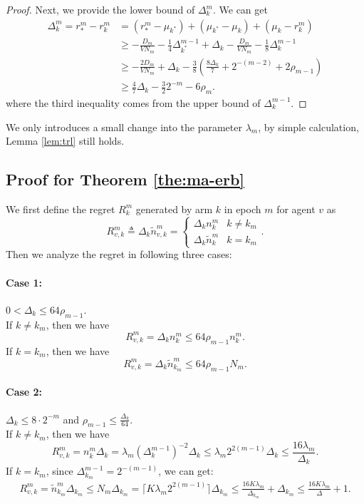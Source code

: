 \begin{proof}
    Next, we provide the lower bound of $\Delta_k^m$. We can get
    \begin{equation*}
    \begin{split}
        \Delta_k^m =  r_*^m - r_k^m
        &= (r_*^m - \mu_{k^*}) + (\mu_{k^*} - \mu_k) + (\mu_k - r_k^m) \\
        &\geq -\frac{D_m}{VN_m} - \frac{1}{4}\Delta_{k^*}^{m-1} + \Delta_k -\frac{D_m}{VN_m} - \frac{1}{8}\Delta_k^{m-1} \\
        &\geq -\frac{2D_m}{VN_m} + \Delta_k - \frac{3}{8}\left(\frac{8 \Delta_k}{7} + 2^{-(m-2)} + 2\rho_{m-1}\right) \\
        &\geq \frac{4}{7}\Delta_k - \frac{3}{2}2^{-m} - 6\rho_m.
    \end{split}
    \end{equation*}
    where the third inequality comes from the upper bound of $\Delta_k^{m-1}$.
\end{proof}

We only introduces a small change into the parameter $\lambda_m$, by simple calculation, Lemma \ref{lem:trl} still holds.

\subsection{Proof for Theorem \ref{the:ma-erb}}

We first define the regret $R_k^m$ generated by arm $k$ in epoch $m$ for agent $v$ as 
\[R_{v,k}^m\triangleq\Delta_k\widetilde{n}_{v,k}^m=\begin{cases}
    \Delta_kn_{k}^m & k\neq k_m\\
    \Delta_k\widetilde{n}_{k}^m & k=k_m
\end{cases}.\]
Then we analyze the regret in following three cases:

\paragraph{Case 1:} $0<\Delta_k\le 64\rho_{m-1}$.\\ %
If $k \neq k_m$, then we have \[R_{v,k}^m=\Delta_k n_{k}^m\le 64\rho_{m-1}n_{k}^m .\] 
If $k=k_m$, then we have \[R_{v,k}^m=\Delta_k\widetilde{n}_{k_m}^m\le 64\rho_{m-1}N_m.\]

\paragraph{Case 2:} $\Delta_k \leq 8 \cdot 2^{-m}$ and $\rho_{m-1} \leq \frac{\Delta_k}{64}$.\\
If $k \neq k_m$, then we have \[R_{v,k}^m=n_{k}^m\Delta_k =\lambda_m(\Delta_k^{m-1})^{-2} \Delta_k \leq \lambda_m 2^{2(m-1)} \Delta_k  \leq \frac{16 \lambda_m}{\Delta_k}.\] 
If $k=k_m$, since $\Delta_{k_m}^{m-1} = 2^{-(m-1)}$, we can get:
\begin{align*}
    R_{v,k}^m=\widetilde{n}_{k_m}^m \Delta_{k_m} \leq 
    N_m\Delta_{k_m} = \lceil K \lambda_m 2^{2(m-1)} \rceil \Delta_{k_m} \leq \frac{16K\lambda_m}{\Delta_{k_m}} + \Delta_{k_m} \leq \frac{16K\lambda_m}{\Delta} + 1.
\end{align*}

